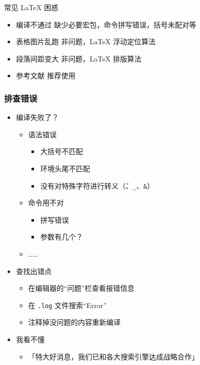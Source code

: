 \begin{frame}{常见 \LaTeX{} 困惑}
  \begin{itemize}
    \item \alert{编译不通过} 缺少必要宏包，命令拼写错误，括号未配对等
    \item \alert{表格图片乱跑} 非问题，\LaTeX{} 浮动定位算法 
    \item \alert{段落间距变大} 非问题，\LaTeX{} 排版算法
    \item \alert{参考文献} 推荐使用 \BibTeX {}
  \end{itemize}
\end{frame}

\begin{frame}[fragile]
  \frametitle{排查错误}
    \begin{itemize}
      \item<+-> 编译失败了？
        \begin{itemize}
          \item 语法错误
            \begin{itemize}
              \item 大括号不匹配
              \item 环境头尾不匹配
              \item 没有对特殊字符进行转义（\texttt{\v}、\texttt{_}、\texttt{&}）
            \end{itemize}
  
        \item 命令用不对
          \begin{itemize}
            \item 拼写错误
            \item 参数有几个？
          \end{itemize}
        \item ……
      \end{itemize}
  
      \item<+-> 查找出错点
      \begin{itemize}
        \item 在编辑器的“问题”栏查看报错信息
        \item 在 \texttt{.log} 文件搜索“Error”
        \item 注释掉没问题的内容重新编译
      \end{itemize}
  
      \item<+-> 我看不懂
      \begin{itemize}
        \item<+-> \alert{「特大好消息，我们已和各大搜索引擎达成战略合作」}
      \end{itemize}
    \end{itemize}
  \end{frame}

